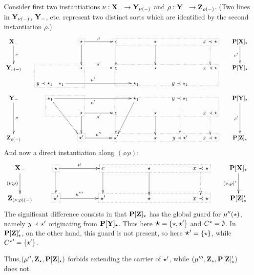 \begin{example}\label{ex:difpush}
Consider first two instantiations $\nu:{\thr
X_\weak}\to\thr{Y_{\nu(\weak)}}$ and 
$\rho:{\thr Y_\weak}\to\thr{Z_{\rho(\weak)}}$. (Two lines in $\thr{Y_{\nu(\weak)}}$,
$\thr{Y_\weak}$, etc. represent two distinct sorts which are identified by
the second instantiation $\rho$.)
\[\xymatrix@R=0.4cm@C=0.7cm{
\thr{X_\weak} \ar[dd]^\nu & &\cons  \save[].[]*\frm{.}\restore  \ar[rr]^{\mu} \ar[dd] && 
    c \save[].[rrrr]*\frm{.}\restore \ar[dd] & & \cons \ar[dd] && x\prec
  \cons \ar@{.>}[dd] & \thr{P[X]_\cons} \ar[dd]_{\nu'}\\ 
&& && && && \\
\thr{Y}_{\nu(\weak)}& & \cons \ar[rr]^{\mu'} && c  && \cons && x \prec\cons
    \save[].[dllll]*\frm{.}\restore  & \thr{P[Y]_\cons}\\
 & y\prec \cons_1\ \ \ \cons_1 \save[].[ru]*\frm{.}\restore
    \ar[rrrr]^{\mu'} &&&& 
   \cons_1 &&  y\prec\cons_1 &  \\ 
\thr{Y_\weak}\ar[ddd]^{\rho} & \cons_1 \save[].[dr]*\frm{.}\restore \ar[dddr]\ar[rrrr]_{\mu'}
&&&&  \cons_1 \ar[dddl] && y\prec \cons_1 \ar@{.>}[ddd] &  & \thr{P[Y]_\cons}
  \ar[ddd]_{\rho'}\\
 & & \cons \ar[dd]  \ar[rr]_{\mu'} && c \ar[dd] && \cons \ar[dd] 
  && x\prec\cons \save[].[ullll]*\frm{.}\restore  \ar@{.>}[dd]\\ 
& & && && && \\
 \thr{Z_{\rho(\weak)}} & & \cons' \save[].[]*\frm{.}\restore \ar[rr]^{\mu''} && 
  \cons' \save[].[rrrr]*\frm{.}\restore && \cons & y\prec\cons' & x \prec
 \cons & \thr{P[Z]_\cons}
}
\]
And now a direct instantiation along $(\comp{\nu}{\rho})$:
\[\xymatrix@R=0.2cm@C=0.9cm{
\thr{X_\weak} \ar[ddd]_{(\nu;\rho)} & \cons \save[].[]*\frm{.}\restore \ar[ddd] \ar[rr]^\mu && 
  c \save[].[rrrr]*\frm{.}\restore \ar[ddd] 
   && \cons \ar[ddd] && x\prec\cons \ar@{.>}[ddd] & \thr{P[X]_\cons} \ar[ddd]_{(\nu;\rho)'}\\
 & && &&&&& \\  & && &&&&& \\
\thr{Z_{(\nu;\rho)(\weak)}} & \cons' \save[].[]*\frm{.}\restore \ar[rr]^{\mu'''} && 
  \cons'  \save[].[rrrr]*\frm{.}\restore
   && \cons  && x\prec\cons  & \thr{P[Z]'_\cons}
}
\]
%
The significant difference consists in that  $\thr{P[Z]_\cons}$  has the
global guard for $\mu''(\cons)$, namely $y\prec\cons'$ originating from
$\thr{P[Y]_\cons}$. Thus here $\Cons=\{\cons,\cons'\}$ and $\subcons=\emptyset$.
In $\thr{P[Z]'_\cons}$, on the other hand, this guard is
not present, so here $\Cons'= \{\cons\}$, while ${\subcons}'=\{\cons'\}$.

Thus,$\pdtsimple{\mu''}{whoever}{\thr{Z_\cons}}{\thr{P[Z]_\cons}}$ forbids
extending the carrier of $\cons'$, while
$\pdtsimple{\mu'''}{whoever}{\thr{Z_\cons}}{\thr{P[Z]'_\cons}}$ does not.
\end{example}
